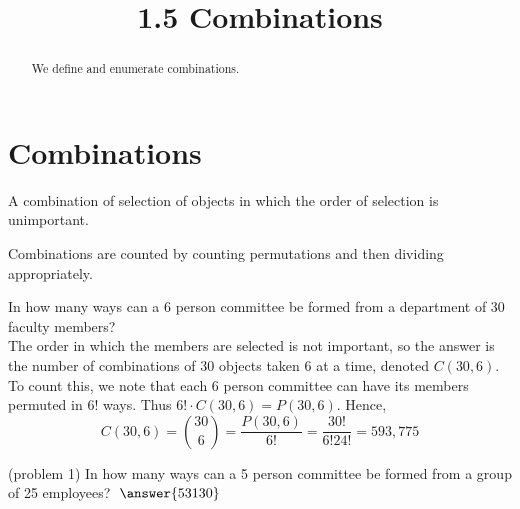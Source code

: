 \documentclass[handout]{ximera}
\title{1.5 Combinations}
\begin{document}
\begin{abstract}
We define and enumerate combinations.
\end{abstract}

\maketitle

\section{Combinations}



\begin{definition}[Combination]
A combination of selection of objects in which the order of selection is unimportant.
\end{definition}

Combinations are counted by counting permutations and then dividing appropriately.


\begin{example}[example 1]
In how many ways can a 6 person committee be formed from a department of 30 faculty members?\\
The order in which the members are selected is not important, so the answer is the number of combinations of 30 objects taken 6 at a time, denoted $C(30,6)$.  To count this, we note that each 6 person committee can have its members permuted in $6!$ ways. Thus $6! \cdot C(30,6) = P(30,6)$.  Hence,
\[
C(30,6) = \binom{30}{6} = \frac{P(30,6)}{6!} = \frac{30!}{6!24!} = 593,775
\]
\end{example}

\begin{problem}(problem 1)
In how many ways can a 5 person committee be formed from a group of 25 employees? $\; \answer{53130}$\\
\end{problem}
\end{document}
